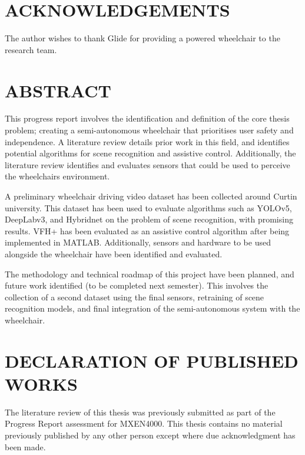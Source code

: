 \documentclass[12pt,twoside]{article}
\begin{document}

\thispagestyle{empty}\null\clearpage


\thispagestyle{empty}\null\clearpage

\section*{ACKNOWLEDGEMENTS}
The author wishes to thank Glide for providing a powered wheelchair to the research team.
\cleardoublepage

\section*{ABSTRACT}
This progress report involves the identification and definition of the core thesis problem;
creating a semi-autonomous wheelchair that prioritises user safety and independence.
A literature review details prior work in this field, and identifies potential algorithms
for scene recognition and assistive control. Additionally, the literature review identifies and evaluates
sensors that could be used to perceive the wheelchairs environment.

A preliminary wheelchair driving video dataset has been collected around Curtin university.
This dataset has been used to evaluate algorithms such as YOLOv5, DeepLabv3, and Hybridnet on
the problem of scene recognition, with promising results. VFH+ has been evaluated as an assistive
control algorithm after being implemented in MATLAB. Additionally, sensors and hardware to be used
alongside the wheelchair have been identified and evaluated.

The methodology and technical roadmap of this project have been planned, and future work identified (to be completed
next semester). This involves the collection of a second dataset using the final sensors, retraining of
scene recognition models, and final integration of the semi-autonomous system with the wheelchair.

\cleardoublepage

\section*{DECLARATION OF PUBLISHED WORKS}
The literature review of this thesis was previously submitted as part of the Progress Report assessment for MXEN4000.
This thesis contains no material previously
published by any other person except where due acknowledgment has been made.
\end{document}
